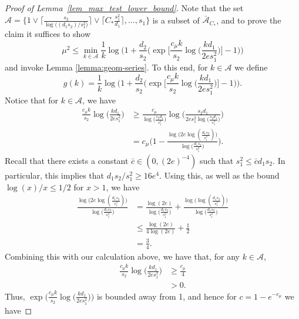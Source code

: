 \documentclass{article}
\newcommand{\cA}{\mathcal{A}}
\newcommand{\Ct}{C_{*}}
\theoremstyle{remark}
\begin{document}
\begin{proof}[Proof of Lemma~\ref{lem_max_test_lower_bound}]
     Note that the set $\cA = \{1 \vee \big\lceil \frac{s_2}{\log\big((d_1s_2)/s_1^2\big)}\big\rceil \vee \big\lceil \Ct \frac{s^2_1}{d_1}\big\rceil, ..., s_1\}$ is a subset of $\bar{\cA}_{\Ct}$, and to prove the claim it suffices to show
    \[\mu^2 \leq \min_{k \in \cA}\frac{1}{k}\log\Bigg(1 + \frac{d_2}{s_2}\bigg(\exp\Big[\frac{c_\mu k}{s_2}\log\big(\frac{kd_1}{2es_1^2}\big)\Big] - 1\bigg)\Bigg)\]
    and invoke Lemma \ref{lemma:geom-series}. To this end, for $k \in \cA$ we define 
    \begin{equation}\label{eq:g}
    g(k) = \frac{1}{k}\log\Bigg(1 + \frac{d_2}{s_2}\bigg(\exp\Big[\frac{c_\mu k}{s_2}\log\big(\frac{kd_1}{2es_1^2}\big)\Big] - 1\bigg)\Bigg).
    \end{equation}
    Notice that for $k \in \cA$, we have 
    \begin{align*}
        \frac{c_\mu k}{s_2}\log\big(\frac{kd_1}{2es_1^2}\big) &\geq \frac{c_\mu}{\log\big(\frac{s_2d_1}{s_1^2}\big)}\log\Big(\frac{s_2d_1}{2es_1^2\log\big(\frac{s_2d_1}{s_1^2}\big)}\Big) \\
        &= c_\mu\Big(1 - \frac{\log\big(2e\log(\frac{d_1s_2}{s_1^2})\big)}{\log\big(\frac{d_1s_2}{s_1^2}\big)}\Big).
    \end{align*}
    Recall that there exists a constant $\bar{c} \in (0, (2e)^{-4})$ such that $s_1^2 \leq \bar{c}d_1s_2$. In particular, this implies that $d_1s_2/s_1^2 \geq 16e^4$. Using this, as well as the bound $\log (x) / x \leq 1/2$ for $x > 1$, we have 
    \begin{align*}
        \frac{\log\big(2e\log(\frac{d_1s_2}{s_1^2})\big)}{\log\big(\frac{d_1s_2}{s_1^2}\big)} &= \frac{\log(2e)}{\log\big(\frac{d_1s_2}{s_1^2}\big)} + \frac{\log\big(\log(\frac{d_1s_2}{s_1^2})\big)}{\log\big(\frac{d_1s_2}{s_1^2}\big)} \\
        &\leq \frac{\log(2e)}{4\log(2e)} + \frac12 \\
        &= \frac34.
    \end{align*}
    Combining this with our calculation above, we have that, for any $k \in \cA$,
    \begin{align*}
        \frac{c_\mu k}{s_2}\log\big(\frac{kd_1}{2es_1^2}\big) &\geq \frac{c_\mu}{4} \\ 
        &> 0.
    \end{align*}
    Thus, $\exp\big(\frac{c_\mu k}{s_2}\log\big(\frac{kd_1}{2es_1^2}\big)\big)$ is bounded away from 1, and hence  for $c = 1 - e^{-c_\mu}$ we have

\end{proof}
\end{document}

